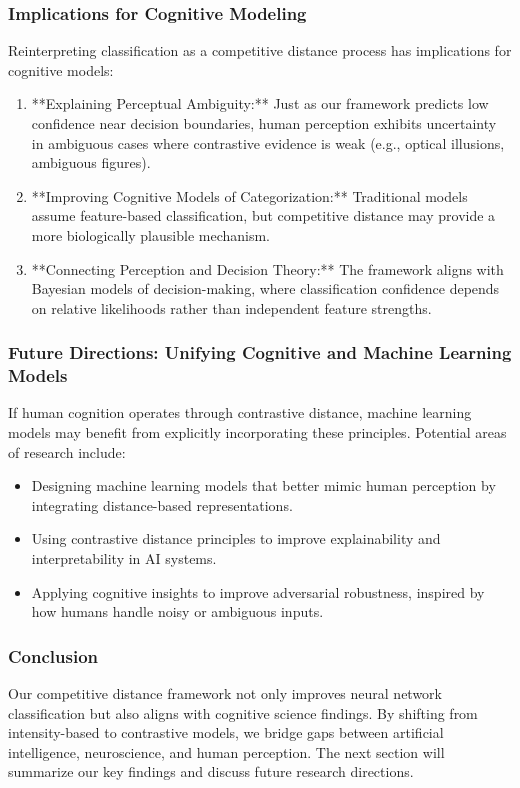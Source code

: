 \subsubsection{Implications for Cognitive Modeling}

Reinterpreting classification as a competitive distance process has implications for cognitive models:

\begin{enumerate}
    \item **Explaining Perceptual Ambiguity:** Just as our framework predicts low confidence near decision boundaries, human perception exhibits uncertainty in ambiguous cases where contrastive evidence is weak (e.g., optical illusions, ambiguous figures).
    \item **Improving Cognitive Models of Categorization:** Traditional models assume feature-based classification, but competitive distance may provide a more biologically plausible mechanism.
    \item **Connecting Perception and Decision Theory:** The framework aligns with Bayesian models of decision-making, where classification confidence depends on relative likelihoods rather than independent feature strengths.
\end{enumerate}

\subsubsection{Future Directions: Unifying Cognitive and Machine Learning Models}

If human cognition operates through contrastive distance, machine learning models may benefit from explicitly incorporating these principles. Potential areas of research include:

\begin{itemize}
    \item Designing machine learning models that better mimic human perception by integrating distance-based representations.
    \item Using contrastive distance principles to improve explainability and interpretability in AI systems.
    \item Applying cognitive insights to improve adversarial robustness, inspired by how humans handle noisy or ambiguous inputs.
\end{itemize}

\subsubsection{Conclusion}

Our competitive distance framework not only improves neural network classification but also aligns with cognitive science findings. By shifting from intensity-based to contrastive models, we bridge gaps between artificial intelligence, neuroscience, and human perception. The next section will summarize our key findings and discuss future research directions.
